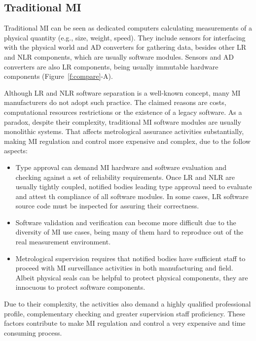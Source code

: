 \documentclass[conference]{IEEEtran}
\begin{document}
\subsection{Traditional MI}
\label{s:mi_traditional}
Traditional MI can be seen as dedicated computers calculating measurements of a physical quantity (e.g., size, weight, speed). They include sensors for interfacing with the physical world and AD converters for gathering data, besides other LR and NLR components, which are usually software modules. Sensors and AD converters are also LR components, being usually immutable hardware components (Figure~\ref{f:compare}-A).

Although LR and NLR software separation is a well-known concept, many MI manufacturers do not adopt such practice. The claimed reasons are costs, computational resources restrictions or the existence of a legacy software. As a paradox, despite their complexity, traditional MI software modules are usually monolithic systems. That affects metrological assurance activities substantially, making MI regulation and control more expensive and complex, due to the follow aspects:
\begin{itemize}
\item Type approval can demand MI hardware and software evaluation and checking against a set of reliability requirements. Once LR and NLR are usually tightly coupled, notified bodies leading type approval need to evaluate and attest th compliance of all software modules. In some cases, LR software source code must be inspected for assuring their correctness.
\item Software validation and verification can become more difficult due to the diversity of MI use cases, being many of them hard to reproduce out of the real measurement environment. 
\item Metrological supervision requires that notified bodies have sufficient staff to proceed with MI surveillance activities in both manufacturing and field. Albeit physical seals can be helpful to protect physical components, they are innocuous to protect software components.
\end{itemize}

Due to their complexity, the activities also demand a highly qualified professional profile, complementary checking and greater supervision staff proficiency. These factors contribute to make MI regulation and control a very expensive and time consuming process.
\end{document}
